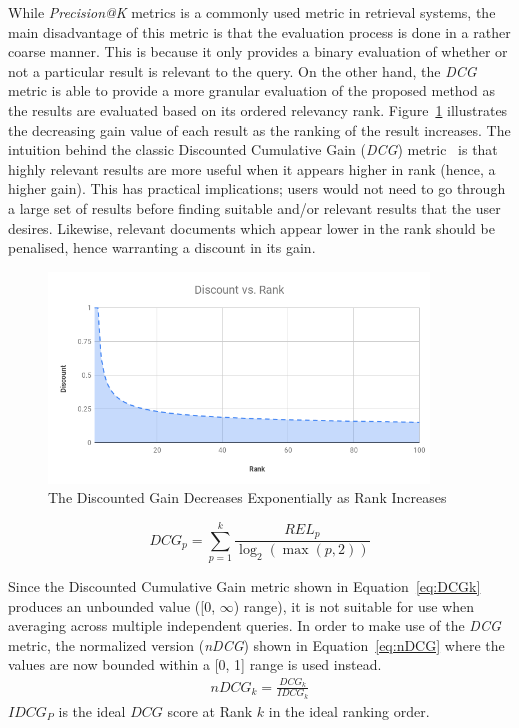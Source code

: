 While \textit{Precision@K} metrics is a commonly used metric in retrieval systems, the main disadvantage of this metric is that the evaluation process is done in a rather coarse manner. 
This is because it only provides a binary evaluation of whether or not a particular result is relevant to the query. On the other hand, the \textit{DCG} metric is able to provide a more granular evaluation of the proposed method as the results are evaluated based on its ordered relevancy rank. Figure~\ref{fig:dcgGain} illustrates the decreasing gain value of each result as the ranking of the
result increases.
The intuition behind the classic Discounted Cumulative Gain (\textit{DCG}) metric~\cite{jarvelin2002cumulated} is that highly relevant results are more useful when it appears higher in rank (hence, a higher gain). This has practical implications; users would not need to go through a large set of results before finding suitable and/or relevant results that the user desires. Likewise, relevant documents which appear lower in the rank should be penalised, hence warranting a discount in its gain.

\begin{figure}[!tb]
\centering
\includegraphics[width=0.9\textwidth]{image/retrievalTwo/discountvsrank.png}
\caption{The Discounted Gain Decreases Exponentially as Rank Increases}
\label{fig:dcgGain}       %
\end{figure}
\begin{equation}
\label{eq:DCGk}
DCG_p = \sum_{p=1}^k\frac{REL_{p}}{\log_2 (\max (p,2))}
\end{equation}

Since the Discounted Cumulative Gain metric shown in Equation~\ref{eq:DCGk} produces an unbounded value ([0, $\infty$) range), it is not suitable for use when averaging across multiple independent queries. In order to make use of the \textit{DCG} metric, the normalized version (\textit{nDCG}) shown in Equation~\ref{eq:nDCG} where
the values are now bounded within a [0, 1] range is used instead.
\begin{align}
\label{eq:nDCG}
\textit{nDCG}_k = \frac{DCG_k}{IDCG_k}
\end{align}
$IDCG_P$ is the ideal $DCG$ score at Rank $k$ in the ideal ranking order.


